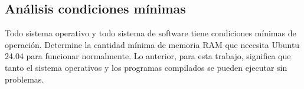 \documentclass[10pt,letterpaper,twoside,onecolumn]{rho-class/rho}
\begin{document}
    \subsection{Análisis condiciones mínimas}


    Todo sistema operativo y todo sistema de software tiene condiciones mínimas de operación. Determine la cantidad mínima de memoria RAM que necesita Ubuntu 24.04 para funcionar normalmente. Lo anterior, para esta trabajo, significa que tanto el sistema operativos y los programas compilados se pueden ejecutar sin problemas.

    
\end{document}
